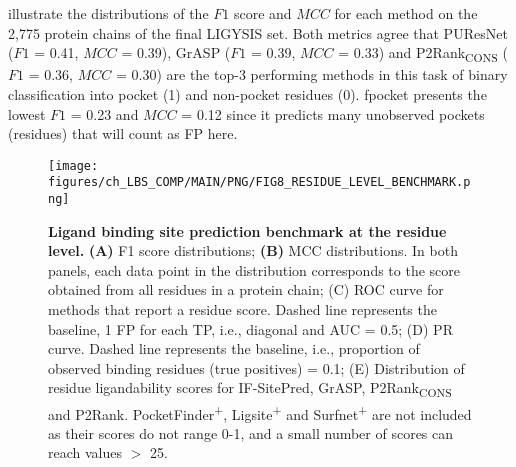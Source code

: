  illustrate the distributions of the $F1$ score and $MCC$ for each method on the 2,775 protein chains of the final LIGYSIS set. Both metrics agree that PUResNet ($F1$ = 0.41, $MCC$ = 0.39), GrASP ($F1$ = 0.39, $MCC$ = 0.33) and P2Rank\textsubscript{CONS} ($F1$ = 0.36, $MCC$ = 0.30) are the top-3 performing methods in this task of binary classification into pocket (1) and non-pocket residues (0). fpocket presents the lowest $F1$ = 0.23 and $MCC$ = 0.12 since it predicts many unobserved pockets (residues) that will count as FP here.

\begin{figure}[ht!]
    \centering
    \texttt{[image: figures/ch\_LBS\_COMP/MAIN/PNG/FIG8\_RESIDUE\_LEVEL\_BENCHMARK.png]}
    \caption[Ligand binding site prediction benchmark at the residue level]{\textbf{Ligand binding site prediction benchmark at the residue level.} \textbf{(A)} F1 score distributions; \textbf{(B)} MCC distributions. In both panels, each data point in the distribution corresponds to the score obtained from all residues in a protein chain; (C) ROC curve for methods that report a residue score. Dashed line represents the baseline, 1 FP for each TP, i.e., diagonal and AUC = 0.5; (D) PR curve. Dashed line represents the baseline, i.e., proportion of observed binding residues (true positives) = 0.1; (E) Distribution of residue ligandability scores for IF-SitePred, GrASP, P2Rank\textsubscript{CONS} and P2Rank. PocketFinder\textsuperscript{+}, Ligsite\textsuperscript{+} and Surfnet\textsuperscript{+} are not included as their scores do not range 0-1, and a small number of scores can reach values $>$ 25.}
    \label{fig:residue_level_benchmark}
\end{figure}

